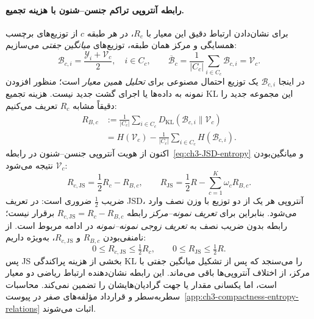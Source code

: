 \paragraph{رابطه آنتروپی تراکم جنسن--شنون با هزینه تجمیع.}
برای نشان‌دادن ارتباط دقیق این معیار با
$R_c$، در هر طبقه $c$ از توزیع‌های
برچسب همسایگی و مرکز همان طبقه،
توزیع‌های \emph{میانگین جفتی} می‌سازیم:
\begin{equation}\label{eq:ch3-R-JS-midpoint-distributions}
\boxed{
\mathscr B_{c,i}
=\frac{\mathscr Y_i+\mathcal V_c}{2},
\quad i\in C_c,
\qquad
\overline{\mathscr B}_c
=\frac1{|C_c|}\sum_{i\in C_c}\mathscr B_{c,i}
=\mathcal V_c.
}
\end{equation}
در اینجا $\mathscr B_{c,i}$ یک توزیع احتمال
مصنوعی برای \emph{تحلیل همین معیار} است؛
منظور افزودن نمونه به داده‌ها یا اجرای
گشت جدید نیست. هزینه تجمیع KL این
مجموعه جدید را دقیقاً مشابه $R_c$ تعریف می‌کنیم:
\begin{equation}\label{eq:ch3-R-midpoint-KL}
\boxed{
\begin{aligned}
R_{B,c}
&:=\frac1{|C_c|}\sum_{i\in C_c}
D_{\mathrm{KL}}(\mathscr B_{c,i}\|\mathcal V_c)\\
&=H(\mathcal V_c)
-\frac1{|C_c|}\sum_{i\in C_c}H(\mathscr B_{c,i}).
\end{aligned}}
\end{equation}
اکنون از هویت آنتروپی جنسن--شنون
در رابطه~\eqref{eq:ch3-JSD-entropy}
و میانگین‌بودن $\mathcal V_c$ نتیجه می‌شود:
\begin{equation}\label{eq:ch3-R-JS-KL-midpoint-identity}
\boxed{
R_{c,\mathrm{JS}}
=\frac12R_c-R_{B,c},
\qquad
R_{\mathrm{JS}}
=\frac12R-\sum_{c=1}^{K}\omega_cR_{B,c}.
}
\end{equation}
ضریب $\frac12$ ضروری است:
در تعریف JSD، آنتروپی هر یک از
دو توزیع با وزن نصف وارد می‌شود.
بنابراین برای \emph{تعریف نمونه--مرکز}
رابطه $R_{c,\mathrm{JS}}=R_c-R_{B,c}$
برقرار نیست؛ رابطه بدون ضریب نصف
به \emph{تعریف زوجی نمونه--نمونه} در ادامه مربوط است.
از نامنفی‌بودن $R_{B,c}$
و $R_{c,\mathrm{JS}}$، به‌ویژه داریم:
\[
0\le R_{c,\mathrm{JS}}\le\tfrac12R_c,
\qquad
0\le R_{\mathrm{JS}}\le\tfrac12R.
\]
پس JS بخشی از هزینه پراکندگی KL را می‌سنجد
که پس از تشکیل میانگین جفتی با مرکز،
از اختلاف آنتروپی‌ها باقی می‌ماند.
این رابطه نشان‌دهنده ارتباط ریاضی
دو معیار است، اما یکسانی مقدار
یا جهت گرادیان‌هایشان را تضمین نمی‌کند.
محاسبات سطر‌به‌سطر و قرارداد مؤلفه‌های صفر
در پیوست~\ref{app:ch3-compactness-entropy-relations}
اثبات می‌شوند.

